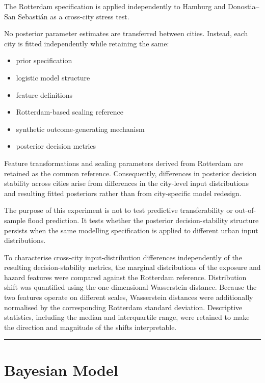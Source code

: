 \documentclass[
]{article}
\providecommand{\tightlist}{%
  \setlength{\itemsep}{0pt}\setlength{\parskip}{0pt}}
\begin{document}
The Rotterdam specification is applied independently to Hamburg and
Donostia--San Sebastián as a cross-city stress test.

No posterior parameter estimates are transferred between cities.
Instead, each city is fitted independently while retaining the same:

\begin{itemize}
\tightlist
\item
  prior specification
\item
  logistic model structure
\item
  feature definitions
\item
  Rotterdam-based scaling reference
\item
  synthetic outcome-generating mechanism
\item
  posterior decision metrics
\end{itemize}

Feature transformations and scaling parameters derived from Rotterdam
are retained as the common reference. Consequently, differences in
posterior decision stability across cities arise from differences in the
city-level input distributions and resulting fitted posteriors rather
than from city-specific model redesign.

The purpose of this experiment is not to test predictive transferability
or out-of-sample flood prediction. It tests whether the posterior
decision-stability structure persists when the same modelling
specification is applied to different urban input distributions.

To characterise cross-city input-distribution differences independently
of the resulting decision-stability metrics, the marginal distributions
of the exposure and hazard features were compared against the Rotterdam
reference. Distribution shift was quantified using the one-dimensional
Wasserstein distance. Because the two features operate on different
scales, Wasserstein distances were additionally normalised by the
corresponding Rotterdam standard deviation. Descriptive statistics,
including the median and interquartile range, were retained to make the
direction and magnitude of the shifts interpretable.

\begin{center}\rule{0.5\linewidth}{0.5pt}\end{center}

\section{Bayesian Model}\label{bayesian-model}
\end{document}
